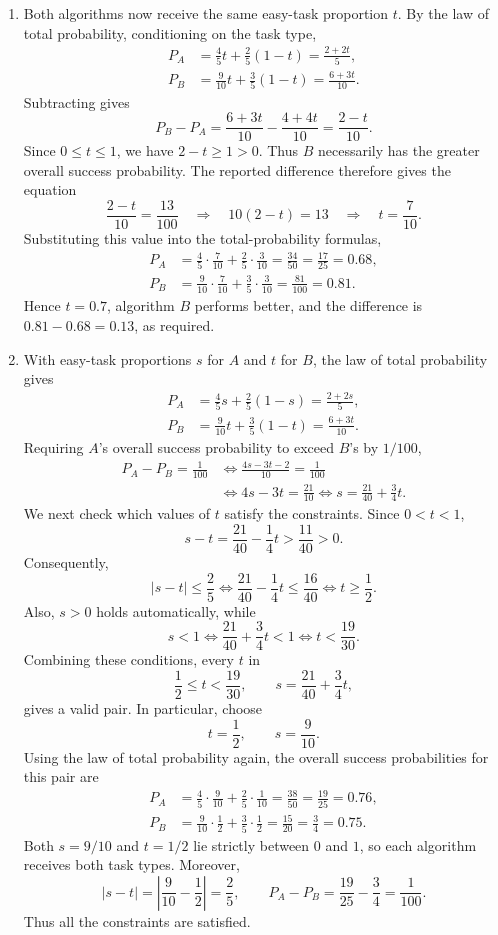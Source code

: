 \documentclass[11pt,a4paper]{article}
\newcommand{\Prob}{P}
\begin{document}
\begin{enumerate}
\item Both algorithms now receive the same easy-task proportion $t$.
By the law of total probability, conditioning on the task type,
\begin{align*}
\Prob_A &= \frac45 t+\frac25(1-t)=\frac{2+2t}{5},\\
\Prob_B &= \frac{9}{10}t+\frac35(1-t)=\frac{6+3t}{10}.
\end{align*}
Subtracting gives
\[
\Prob_B-\Prob_A
=\frac{6+3t}{10}-\frac{4+4t}{10}
=\frac{2-t}{10}.
\]
Since $0\le t\le1$, we have $2-t\ge1>0$. Thus $B$ necessarily has
the greater overall success probability. The reported difference therefore
gives the equation
\[
\frac{2-t}{10}=\frac{13}{100}
\quad\Longrightarrow\quad
10(2-t)=13
\quad\Longrightarrow\quad
t=\frac7{10}.
\]
Substituting this value into the total-probability formulas,
\begin{align*}
\Prob_A &= \frac45\cdot\frac7{10}+\frac25\cdot\frac3{10}
          =\frac{34}{50}=\frac{17}{25}=0.68,\\
\Prob_B &= \frac{9}{10}\cdot\frac7{10}+\frac35\cdot\frac3{10}
          =\frac{81}{100}=0.81.
\end{align*}
Hence $t=0.7$, algorithm $B$ performs better, and the difference is
$0.81-0.68=0.13$, as required.

\item With easy-task proportions $s$ for $A$ and $t$ for $B$, the law of
total probability gives
\begin{align*}
\Prob_A &= \frac45 s+\frac25(1-s)=\frac{2+2s}{5},\\
\Prob_B &= \frac{9}{10}t+\frac35(1-t)=\frac{6+3t}{10}.
\end{align*}
Requiring $A$'s overall success probability to exceed $B$'s by $1/100$,
\[
\begin{aligned}
\Prob_A-\Prob_B=\frac1{100}
&\iff \frac{4s-3t-2}{10}=\frac1{100}\\
&\iff 4s-3t=\frac{21}{10}
\iff s=\frac{21}{40}+\frac34 t.
\end{aligned}
\]
We next check which values of $t$ satisfy the constraints. Since
$0<t<1$,
\[
s-t=\frac{21}{40}-\frac14 t>\frac{11}{40}>0.
\]
Consequently,
\[
|s-t|\le\frac25
\iff \frac{21}{40}-\frac14 t\le\frac{16}{40}
\iff t\ge\frac12.
\]
Also, $s>0$ holds automatically, while
\[
s<1
\iff \frac{21}{40}+\frac34 t<1
\iff t<\frac{19}{30}.
\]
Combining these conditions, every $t$ in
\[
\frac12\le t<\frac{19}{30},\qquad
s=\frac{21}{40}+\frac34 t,
\]
gives a valid pair. In particular, choose
\[
t=\frac12,\qquad s=\frac9{10}.
\]
Using the law of total probability again, the overall success probabilities
for this pair are
\begin{align*}
\Prob_A &= \frac45\cdot\frac9{10}+\frac25\cdot\frac1{10}
          =\frac{38}{50}=\frac{19}{25}=0.76,\\
\Prob_B &= \frac{9}{10}\cdot\frac12+\frac35\cdot\frac12
          =\frac{15}{20}=\frac34=0.75.
\end{align*}
Both $s=9/10$ and $t=1/2$ lie strictly between $0$ and $1$, so each
algorithm receives both task types. Moreover,
\[
|s-t|=\left|\frac9{10}-\frac12\right|=\frac25,
\qquad
\Prob_A-\Prob_B=\frac{19}{25}-\frac34=\frac1{100}.
\]
Thus all the constraints are satisfied.


\end{enumerate}
\end{document}
